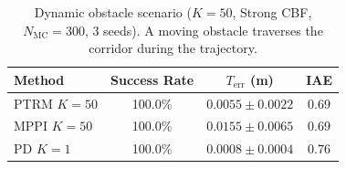 \begin{table}[t]
\centering
\caption{Dynamic obstacle scenario ($K\!=\!50$, Strong CBF, $N_{\mathrm{MC}}=300$, 3 seeds). A moving obstacle traverses the corridor during the trajectory.}
\label{tab:dynamic_obstacle}
\begin{tabular}{lccc}
\toprule
Method & Success Rate & $T_{\mathrm{err}}$ (m) & IAE \\
\midrule
  PTRM $K\!=\!50$ & 100.0\% & $0.0055 \pm 0.0022$ & 0.69 \\
  MPPI $K\!=\!50$ & 100.0\% & $0.0155 \pm 0.0065$ & 0.69 \\
  PD $K\!=\!1$ & 100.0\% & $0.0008 \pm 0.0004$ & 0.76 \\
\bottomrule
\end{tabular}
\end{table}
